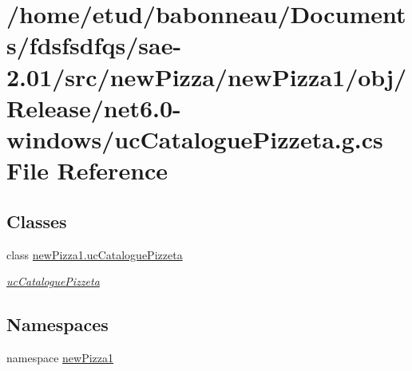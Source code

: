 \hypertarget{Release_2net6_80-windows_2ucCataloguePizzeta_8g_8cs}{}\section{/home/etud/babonneau/\+Documents/fdsfsdfqs/sae-\/2.01/src/new\+Pizza/new\+Pizza1/obj/\+Release/net6.0-\/windows/uc\+Catalogue\+Pizzeta.g.\+cs File Reference}
\label{Release_2net6_80-windows_2ucCataloguePizzeta_8g_8cs}
\subsection*{Classes}
\begin{DoxyCompactItemize}
\item 
class \hyperlink{classnewPizza1_1_1ucCataloguePizzeta}{new\+Pizza1.\+uc\+Catalogue\+Pizzeta}
\begin{DoxyCompactList}\small\item\em \hyperlink{classnewPizza1_1_1ucCataloguePizzeta}{uc\+Catalogue\+Pizzeta} \end{DoxyCompactList}\end{DoxyCompactItemize}
\subsection*{Namespaces}
\begin{DoxyCompactItemize}
\item 
namespace \hyperlink{namespacenewPizza1}{new\+Pizza1}
\end{DoxyCompactItemize}
